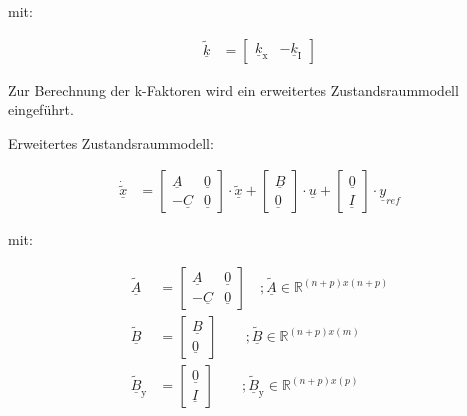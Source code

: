 mit:

\begin{align}
    \underline{\tilde{k}} &= 
    \begin{bmatrix}
    \underline{k}_{\mathrm{x}} & -\underline{k}_{\mathrm{I}}
    \end{bmatrix}
    \label{eq:Gleichung27}
\end{align}

Zur Berechnung der k-Faktoren wird ein erweitertes Zustandsraummodell eingeführt.\\
\newline

Erweitertes Zustandsraummodell:

\begin{align}
    \underline{\dot{\tilde{x}}} &= 
    \begin{bmatrix}
        \underline{A} & \underline{0} \\
        -\underline{C} & \underline{0}
    \end{bmatrix} \cdot \underline{\tilde{x}} +
    \begin{bmatrix}
        \underline{B} \\
        \underline{0}
    \end{bmatrix} \cdot\underline{u} +
    \begin{bmatrix}
        \underline{0} \\
        \underline{I}
    \end{bmatrix} \cdot\underline{y}_{ref}
    \label{eq:Gleichung28}
\end{align}

mit:

\begin{align*}
    \underline{\tilde{A}} &= 
    \begin{bmatrix}
        \underline{A} & \underline{0} \\
        -\underline{C} & \underline{0}
    \end{bmatrix} \quad ; \underline{\tilde{A}}\in\mathbb{R}^{(n+p)x(n+p)}\\
    \underline{\tilde{B}} &= 
    \begin{bmatrix}
        \underline{B} \\
        \underline{0}
    \end{bmatrix}\qquad ; \underline{\tilde{B}}\in\mathbb{R}^{(n+p)x(m)}\\
    \underline{\tilde{B}}_{\mathrm{y}} &= 
    \begin{bmatrix}
        \underline{0} \\
        \underline{I}
    \end{bmatrix}\qquad  ;\underline{\tilde{B}}_{\mathrm{y}}\in\mathbb{R}^{(n+p)x(p)}
\end{align*}

